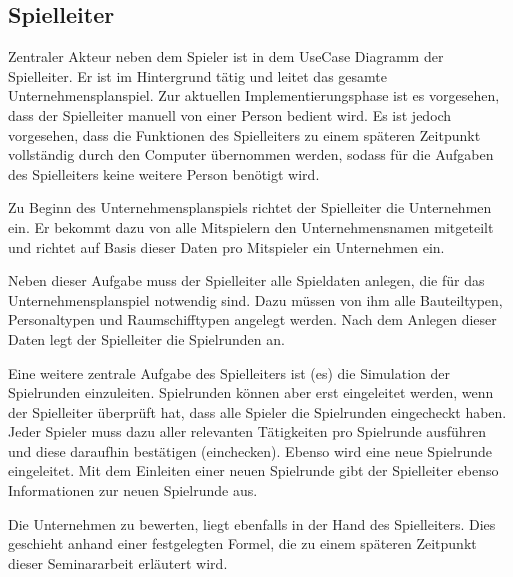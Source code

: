 \subsection{Spielleiter}
\label{sec:fachkonzept-usecase-spielleiter}


Zentraler Akteur neben dem Spieler ist in dem UseCase Diagramm der Spielleiter. Er ist im Hintergrund tätig und leitet das gesamte Unternehmensplanspiel. Zur aktuellen Implementierungsphase ist es vorgesehen, dass der Spielleiter manuell von einer Person bedient wird. Es ist jedoch vorgesehen, dass die Funktionen des Spielleiters zu einem späteren Zeitpunkt vollständig durch den Computer übernommen werden, sodass für die Aufgaben des Spielleiters keine weitere Person benötigt wird.
 
Zu Beginn des Unternehmensplanspiels richtet der Spielleiter die Unternehmen ein. Er bekommt dazu von alle Mitspielern den Unternehmensnamen mitgeteilt und richtet auf Basis dieser Daten pro Mitspieler ein Unternehmen ein.
 
Neben dieser Aufgabe muss der Spielleiter alle Spieldaten anlegen, die für das Unternehmensplanspiel notwendig sind. Dazu müssen von ihm alle Bauteiltypen, Personaltypen und Raumschifftypen angelegt werden. Nach dem Anlegen dieser Daten legt der Spielleiter die Spielrunden an.
 
Eine weitere zentrale Aufgabe des Spielleiters ist (es) die Simulation der Spielrunden einzuleiten. Spielrunden können aber erst eingeleitet werden, wenn der Spielleiter überprüft hat, dass alle Spieler die Spielrunden eingecheckt haben. Jeder Spieler muss dazu aller relevanten Tätigkeiten pro Spielrunde ausführen und diese daraufhin bestätigen (einchecken). Ebenso wird eine neue Spielrunde eingeleitet.  Mit dem Einleiten einer neuen Spielrunde gibt der Spielleiter ebenso Informationen zur neuen Spielrunde aus.
 
Die Unternehmen zu bewerten, liegt ebenfalls in der Hand des Spielleiters. Dies geschieht anhand einer festgelegten Formel, die zu einem späteren Zeitpunkt dieser Seminararbeit erläutert wird.

\autorende{}